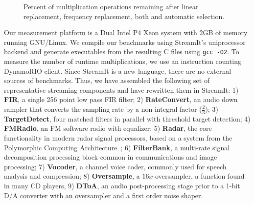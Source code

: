 \begin{figure}[t]
\center
\epsfxsize=3.2in
\vspace{-6pt}
\caption{Percent of multiplication operations remaining after 
  linear replacement, frequency replacement, both and automatic selection.}
\label{fig:linear-freq-both}
\vspace{-12pt}
\end{figure}


Our measurement platform is a Dual Intel P4 Xeon system with 2GB of
memory running GNU/Linux.  We compile our benchmarks using StreamIt's
uniprocessor backend and generate executables from the resulting C
files using {\tt gcc -O2}.  To measure the number of runtime
multiplications, we use an instruction counting
DynamoRIO\cite{dynamo99} client.  Since StreamIt is a new language,
there are no external sources of benchmarks.  Thus, we have assembled
the following set of representative streaming components and have
rewritten them in StreamIt: 1) {\bf FIR}, a single 256 point low pass
FIR filter; 2) {\bf RateConvert}, an audio down sampler that converts
the sampling rate by a non-integral factor ($\frac{2}{3}$); 3) {\bf
TargetDetect}, four matched filters in parallel with threshold target
detection; 4) {\bf FMRadio}, an FM software radio with equalizer; 5)
{\bf Radar}, the core functionality in modern radar signal processors,
based on a system from the Polymorphic Computing
Architecture~\cite{pca}; 6) {\bf FilterBank}, a multi-rate signal
decomposition processing block common in communications and image
processing; 7) {\bf Vocoder}, a channel voice coder, commonly used for
speech analysis and compression; 8) {\bf Oversample}, a $16x$
oversampler, a function found in many CD players, 9) {\bf DToA}, an
audio post-processing stage prior to a 1-bit D/A converter with an
oversampler and a first order noise shaper.

